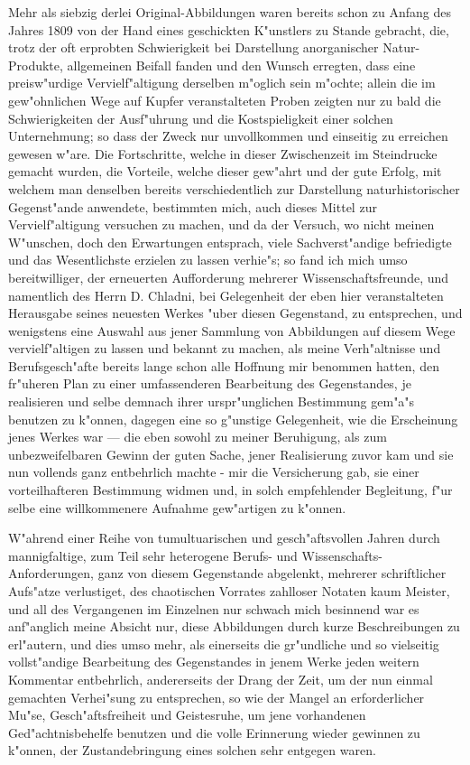 \documentclass[a4paper, 11pt, oneside, german]{article}
\begin{document}
Mehr als siebzig derlei Original-Abbildungen waren bereits schon zu Anfang des Jahres 1809 von der Hand eines geschickten K"unstlers zu Stande gebracht, die, trotz der oft erprobten Schwierigkeit bei Darstellung anorganischer Natur-Produkte, allgemeinen Beifall fanden und den Wunsch erregten, dass eine preisw"urdige Vervielf"altigung derselben m"oglich sein m"ochte; allein die im gew"ohnlichen Wege auf Kupfer veranstalteten Proben zeigten nur zu bald die Schwierigkeiten der Ausf"uhrung und die Kostspieligkeit einer solchen Unternehmung; so dass der Zweck nur unvollkommen und einseitig zu erreichen gewesen w"are. Die Fortschritte, welche in dieser Zwischenzeit im Steindrucke gemacht wurden, die Vorteile, welche dieser gew"ahrt und der gute Erfolg, mit welchem man denselben bereits verschiedentlich zur Darstellung naturhistorischer Gegenst"ande anwendete, bestimmten mich, auch dieses Mittel zur Vervielf"altigung versuchen zu machen, und da der Versuch, wo nicht meinen W"unschen, doch den Erwartungen entsprach, viele Sachverst"andige befriedigte und das Wesentlichste erzielen zu lassen verhie"s; so fand ich mich umso bereitwilliger, der erneuerten Aufforderung mehrerer Wissenschaftsfreunde, und namentlich des Herrn D. Chladni, bei Gelegenheit der eben hier veranstalteten Herausgabe seines neuesten Werkes "uber diesen Gegenstand, zu entsprechen, und wenigstens eine Auswahl aus jener Sammlung von Abbildungen auf diesem Wege vervielf"altigen zu lassen und bekannt zu machen, als meine Verh"altnisse und Berufsgesch"afte bereits lange schon alle Hoffnung mir benommen hatten, den fr"uheren Plan zu einer umfassenderen Bearbeitung des Gegenstandes, je realisieren und selbe demnach ihrer urspr"unglichen Bestimmung gem"a"s benutzen zu k"onnen, dagegen eine so g"unstige Gelegenheit, wie die Erscheinung jenes Werkes war --- die eben sowohl zu meiner Beruhigung, als zum unbezweifelbaren Gewinn der guten Sache, jener Realisierung zuvor kam und sie nun vollends ganz entbehrlich machte - mir die Versicherung gab, sie einer vorteilhafteren Bestimmung widmen und, in solch empfehlender Begleitung, f"ur selbe eine willkommenere Aufnahme gew"artigen zu k"onnen.

W"ahrend einer Reihe von tumultuarischen und gesch"aftsvollen Jahren durch mannigfaltige, zum Teil sehr heterogene Berufs- und Wissenschafts-Anforderungen, ganz von diesem Gegenstande abgelenkt, mehrerer schriftlicher Aufs"atze verlustiget, des chaotischen Vorrates zahlloser Notaten kaum Meister, und all des Vergangenen im Einzelnen nur schwach mich besinnend war es anf"anglich meine Absicht nur, diese Abbildungen durch kurze Beschreibungen zu erl"autern, und dies umso mehr, als einerseits die gr"undliche und so vielseitig vollst"andige Bearbeitung des Gegenstandes in jenem Werke jeden weitern Kommentar entbehrlich, andererseits der Drang der Zeit, um der nun einmal gemachten Verhei"sung zu entsprechen, so wie der Mangel an erforderlicher Mu"se, Gesch"aftsfreiheit und Geistesruhe, um jene vorhandenen Ged"achtnisbehelfe benutzen und die volle Erinnerung wieder gewinnen zu k"onnen, der Zustandebringung eines solchen sehr entgegen waren.
\end{document}

